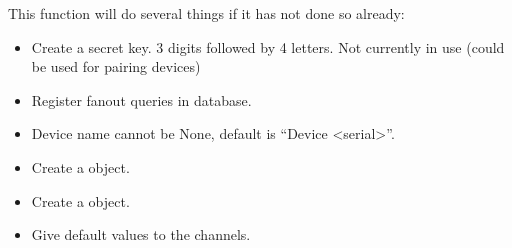 \documentclass[letterpaper,10pt,english]{sphinxmanual}
\begin{document}
\begin{fulllineitems}
\begin{fulllineitems}
This function will do several things if it has not done so already:
\begin{itemize}
\item {} 
Create a secret key. 3 digits followed by 4 letters. Not currently in use (could be used for pairing devices)

\item {} 
Register fanout queries in database.

\item {} 
Device name cannot be None, default is ``Device \textless{}serial\textgreater{}''.

\item {} 
Create a {\hyperref[modules/farmer:farmer.models.DeviceSettings]{\emph{}}} object.

\item {} 
Create a {\hyperref[modules/webapp:webapp.models.DeviceWebSettings]{\emph{}}} object.

\item {} 
Give default values to the channels.

\end{itemize}

\end{fulllineitems}


\begin{fulllineitems}
\label{modules/microdata:microdata.models.Device.share_with}
\end{fulllineitems}


\end{fulllineitems}

\end{document}
